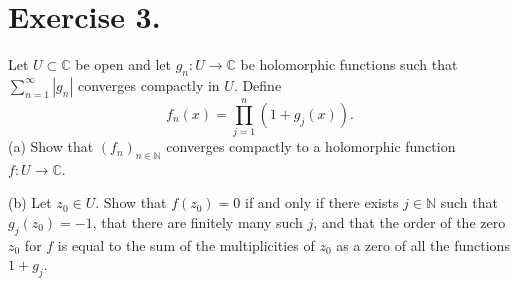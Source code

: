 
\section{Exercise 3.}

Let \(U \subset \mathbb{C}\) be open and let \(g_n : U \to \mathbb{C}\) be holomorphic functions such that \(\sum_{n=1}^{\infty} |g_n|\) converges compactly in \(U\). Define
\[
f_n(x) = \prod_{j=1}^{n} (1 + g_j(x)).
\]
(a) Show that \((f_n)_{n \in \mathbb{N}}\) converges compactly to a holomorphic function \(f : U \to \mathbb{C}\).

(b) Let \(z_0 \in U\). Show that \(f(z_0) = 0\) if and only if there exists \(j \in \mathbb{N}\) such that \(g_j(z_0) = -1\), that there are finitely many such \(j\), and that the order of the zero \(z_0\) for \(f\) is equal to the sum of the multiplicities of \(z_0\) as a zero of all the functions \(1 + g_j\).
